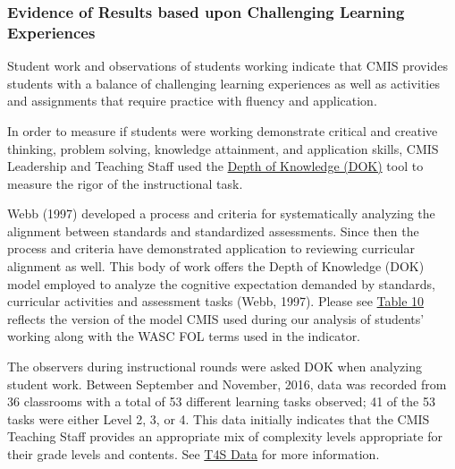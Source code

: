 \subsubsection{Evidence of Results based upon Challenging Learning Experiences }



\begin{findings}
Student work and observations of students working indicate that CMIS provides students with a balance of challenging learning experiences as well as activities and assignments that require practice with fluency and application.  


In order to measure if students were working demonstrate critical and creative thinking, problem solving, knowledge attainment, and application skills, CMIS Leadership and Teaching Staff used the  \href{https://drive.google.com/a/cmis.ac.th/file/d/0ByVFfrm0zfolNVJmeEJwcHUxbjg/view?usp=sharing}{Depth of Knowledge (DOK)} tool to measure the rigor of the  instructional task. 

Webb (1997) developed a process and criteria for systematically analyzing the alignment between standards and standardized assessments. Since then the process and criteria have demonstrated application to reviewing curricular alignment as well. This body of work offers the Depth of Knowledge (DOK) model employed to analyze the cognitive expectation demanded by standards, curricular activities and assessment tasks (Webb, 1997). Please see \href{https://docs.google.com/a/cmis.ac.th/document/d/1cZlDn-POZCJs2XZ1SLF-CL_DtiO4GscppQ71QZJtFGg/edit?usp=sharing}{Table 10} reflects the version of the model CMIS used during our analysis of  students’ working along with the WASC FOL terms used in the indicator. 

The observers during instructional rounds were asked DOK when analyzing student work. Between September and November, 2016, data was recorded from 36 classrooms with a total of 53 different learning tasks observed; 41 of the 53 tasks were either Level 2, 3, or 4. This data initially indicates that the CMIS Teaching Staff provides an appropriate mix of complexity levels appropriate for their grade levels and contents. See \href{https://docs.google.com/a/cmis.ac.th/document/d/1cRvL50iIDvo8s1Gnxoczm82LhSVmEOvCrFksxzHD7ko/edit?usp=sharing}{T4S Data} for more information. 


\end{findings}
